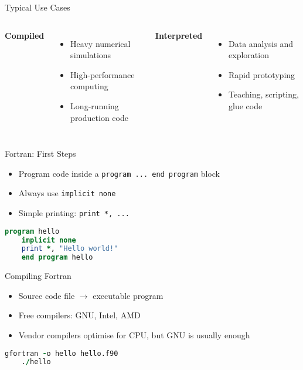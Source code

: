 \begin{frame}{Typical Use Cases}
	\begin{columns}[T]
		\textbf{Compiled}
		\begin{itemize}
			\item Heavy numerical simulations
			\item High-performance computing
			\item Long-running production code
		\end{itemize}
		
		\textbf{Interpreted}
		\begin{itemize}
			\item Data analysis and exploration
			\item Rapid prototyping
			\item Teaching, scripting, glue code
		\end{itemize}
	\end{columns}
\end{frame}


\begin{frame}[fragile]{Fortran: First Steps}
	\begin{itemize}
		\item Program code inside a \texttt{program ... end program} block
		\item Always use \texttt{implicit none}
		\item Simple printing: \texttt{print *, ...}
	\end{itemize}
	\begin{lstlisting}[language=Fortran]
	program hello
	implicit none
	print *, "Hello world!"
	end program hello
	\end{lstlisting}
\end{frame}

\begin{frame}[fragile]{Compiling Fortran}
	\begin{itemize}
		\item Source code file $\to$ executable program
		\item Free compilers: GNU, Intel, AMD
		\item Vendor compilers optimise for CPU, but GNU is usually enough
	\end{itemize}
	\begin{lstlisting}[language=Fortran]
	gfortran -o hello hello.f90
	./hello
	\end{lstlisting}
\end{frame}

